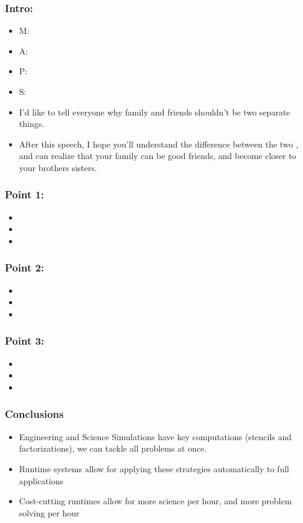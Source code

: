 

\begin{frame}
\frametitle{Intro:} 
\begin{itemize} 
\item M: 
\item A:  
\item P: 
\item S:
\item I'd like to tell everyone why family and friends shouldn't be two separate things. 
\item After this speech, I hope you'll understand the difference between the two , and can realize that your family can be good friends, and become closer to your brothers sisters. 
\end{itemize} 
\end{frame} 

\begin{frame}
\frametitle{Point 1:}
\begin{itemize}
\item 
\item 
\item 
\end{itemize}
\end{frame}

\begin{frame}
\frametitle{Point 2:}
\begin{itemize}
\item
\item 
\item
\end{itemize}
\end{frame} 

\begin{frame}
\frametitle{Point 3:}
\begin{itemize}
\item 
\item 
\item 
\end{itemize}
\end{frame}

\begin{frame}
\frametitle{Conclusions}
\begin{itemize}
\item Engineering and Science Simulations have key computations (stencils and factorizations), we can tackle all problems at once.
\item Runtime systems allow for applying these strategies automatically to full applications
\item Cost-cutting runtimes allow for more science per hour, and more problem solving per hour
\end{itemize}
\end{frame}










